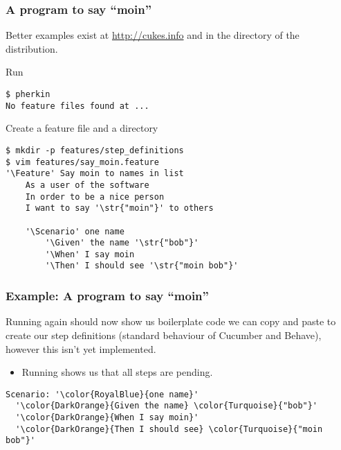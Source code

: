 \documentclass[10pt]{vcs_beamer}
\newcommand{\str}[1]{\color{Turquoise}{#1}}
\newcommand{\Feature}{\color{BlueViolet}{Feature:}}
\newcommand{\Scenario}{\color{BlueViolet}{Scenario:}}
\newcommand{\Given}{\color{DarkOrange}{Given}}
\newcommand{\When}{\color{RoyalBlue}{When}}
\newcommand{\Then}{\color{ForestGreen}{Then}}
\begin{document}
\begin{frame}[fragile]
\frametitle{A program to say ``moin''}

Better examples exist at {\footnotesize \url{http://cukes.info}} and in the
 directory of the  distribution.

Run 
\begin{lstlisting}
$ pherkin
No feature files found at ...
\end{lstlisting}

Create a feature file and a  directory
\begin{lstlisting}[escapeinside='']
$ mkdir -p features/step_definitions
$ vim features/say_moin.feature
'\Feature' Say moin to names in list
    As a user of the software
    In order to be a nice person
    I want to say '\str{"moin"}' to others

    '\Scenario' one name
        '\Given' the name '\str{"bob"}'
        '\When' I say moin
        '\Then' I should see '\str{"moin bob"}'
\end{lstlisting}

\end{frame}

\begin{frame}[fragile]
\frametitle{Example: A program to say ``moin''}

Running  again should now show us boilerplate code we can copy
and paste to create our step definitions (standard behaviour of Cucumber and
Behave), however this isn't yet implemented.

\begin{itemize}
    \item Running  shows us that all steps are pending.
\end{itemize}

\begin{lstlisting}[escapeinside='']
Scenario: '\color{RoyalBlue}{one name}'
  '\color{DarkOrange}{Given the name} \color{Turquoise}{"bob"}'
  '\color{DarkOrange}{When I say moin}'
  '\color{DarkOrange}{Then I should see} \color{Turquoise}{"moin bob"}'
\end{lstlisting}

\end{frame}
\end{document}
